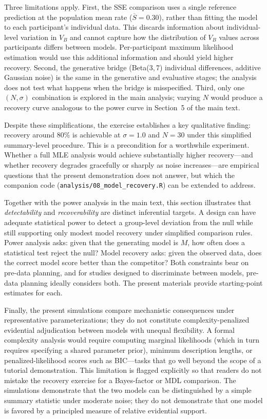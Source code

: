 \documentclass[11pt,a4paper]{article}
\begin{document}
Three limitations apply. First, the SSE comparison uses a single reference prediction at the population mean rate ($\overline{S} = 0.30$), rather than fitting the model to each participant's individual data. This discards information about individual-level variation in $V_B$ and cannot capture how the distribution of $V_B$ values across participants differs between models. Per-participant maximum likelihood estimation would use this additional information and should yield higher recovery. Second, the generative bridge (Beta(3,\,7) individual differences, additive Gaussian noise) is the same in the generative and evaluative stages; the analysis does not test what happens when the bridge is misspecified. Third, only one $(N, \sigma)$ combination is explored in the main analysis; varying $N$ would produce a recovery curve analogous to the power curve in Section~5 of the main text.

Despite these simplifications, the exercise establishes a key qualitative finding: recovery around 80\% is achievable at $\sigma = 1.0$ and $N = 30$ under this simplified summary-level procedure. This is a precondition for a worthwhile experiment. Whether a full MLE analysis would achieve substantially higher recovery---and whether recovery degrades gracefully or sharply as noise increases---are empirical questions that the present demonstration does not answer, but which the companion code (\texttt{analysis/08\_model\_recovery.R}) can be extended to address.

Together with the power analysis in the main text, this section illustrates that \emph{detectability} and \emph{recoverability} are distinct inferential targets. A design can have adequate statistical power to detect a group-level deviation from the null while still supporting only modest model recovery under simplified comparison rules. Power analysis asks: given that the generating model is $M$, how often does a statistical test reject the null? Model recovery asks: given the observed data, does the correct model score better than the competitor? Both constraints bear on pre-data planning, and for studies designed to discriminate between models, pre-data planning ideally considers both. The present materials provide starting-point estimates for each.

Finally, the present simulations compare mechanistic consequences under representative parameterizations; they do not constitute complexity-penalized evidential adjudication between models with unequal flexibility. A formal complexity analysis would require computing marginal likelihoods (which in turn requires specifying a shared parameter prior), minimum description lengths, or penalized-likelihood scores such as BIC---tasks that go well beyond the scope of a tutorial demonstration. This limitation is flagged explicitly so that readers do not mistake the recovery exercise for a Bayes-factor or MDL comparison. The simulations demonstrate that the two models can be distinguished by a simple summary statistic under moderate noise; they do not demonstrate that one model is favored by a principled measure of relative evidential support.




\end{document}
